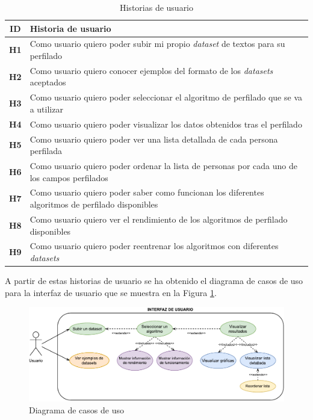 \bigskip
\begin{table}[H]
	\centering
	\begin{tabular}{|c|p{11cm}|}
		\rowcolor{udcpink!25}
		\hline
		\small \textbf{ID}                 & \small \textbf{Historia de usuario}                                                                      \\\hline
		\small \textbf{H1} \label{req:hu1} & \small Como usuario quiero poder subir mi propio \textit{dataset} de textos para su perfilado                     \\ \hline
		\small \textbf{H2} \label{req:hu2} & \small Como usuario quiero conocer ejemplos del formato de los \textit{datasets} aceptados                        \\ \hline
		\small \textbf{H3} \label{req:hu3} & \small Como usuario quiero poder seleccionar el algoritmo de perfilado que se va a utilizar              \\ \hline
		\small \textbf{H4} \label{req:hu4} & \small Como usuario quiero poder visualizar los datos obtenidos tras el perfilado                        \\ \hline
		\small \textbf{H5} \label{req:hu5} & \small Como usuario quiero poder ver una lista detallada de cada persona perfilada                       \\ \hline
		\small \textbf{H6} \label{req:hu6} & \small Como usuario quiero poder ordenar la lista de personas por cada uno de los campos perfilados      \\ \hline
		\small \textbf{H7} \label{req:hu7} & \small Como usuario quiero poder saber como funcionan los diferentes algoritmos de perfilado disponibles \\ \hline
		\small \textbf{H8} \label{req:hu8} & \small Como usuario quiero ver el rendimiento de los algoritmos de perfilado disponibles                 \\ \hline
		\small \textbf{H9} \label{req:hu9} & \small Como usuario quiero poder reentrenar los algoritmos con diferentes \textit{datasets}                       \\ \hline
	\end{tabular}
	\caption{Historias de usuario}
	\label{tab:historias_usuario}
\end{table}

A partir de estas historias de usuario se ha obtenido el diagrama de casos de uso
para la interfaz de usuario que se muestra en la Figura \ref{fig:casos_uso}.

\bigskip
\begin{figure}[H]
	\centering
	\includegraphics[width=\textwidth]{diagramas/usecases.pdf}
	\caption{Diagrama de casos de uso}
	\label{fig:casos_uso}
\end{figure}

